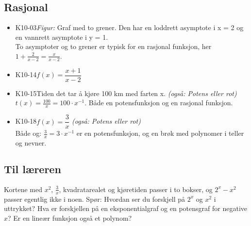 \documentclass[11pt,a4paper]{article}
\begin{document}
\subsection*{Rasjonal}
\begin{itemize}[leftmargin=1.2em, itemsep=0.35em]
\item \textsf{\small K10-03}\quad \emph{Figur:} Graf med to grener. Den har en loddrett asymptote i x = 2 og en vannrett asymptote i y = 1.\\{\small\color{dempet}To asymptoter og to grener er typisk for en rasjonal funksjon, her $1 + \frac{2}{x - 2} = \frac{x}{x - 2}$.}
\item \textsf{\small K10-14}\quad $f(x) = \dfrac{x + 1}{x - 2}$
\item \textsf{\small K10-15}\quad Tiden det tar å kjøre 100 km med farten x. \emph{(også: Potens eller rot)}\\{\small\color{dempet}$t(x) = \frac{100}{x} = 100 \cdot x^{-1}$. Både en potensfunksjon og en rasjonal funksjon.}
\item \textsf{\small K10-18}\quad $f(x) = \dfrac{3}{x}$ \emph{(også: Potens eller rot)}\\{\small\color{dempet}Både og: $\frac{3}{x} = 3 \cdot x^{-1}$ er en potensfunksjon, og en brøk med polynomer i teller og nevner.}
\end{itemize}
\subsection*{Til læreren}
Kortene med $x^2$, $\frac{3}{x}$, kvadratarealet og kjøretiden passer i to bokser, og $2^x - x^2$ passer egentlig ikke i noen. Spør: Hvordan ser du forskjell på $2^x$ og $x^2$ i uttrykket? Hva er forskjellen på en eksponentialgraf og en potensgraf for negative $x$? Er en lineær funksjon også et polynom?
\end{document}
